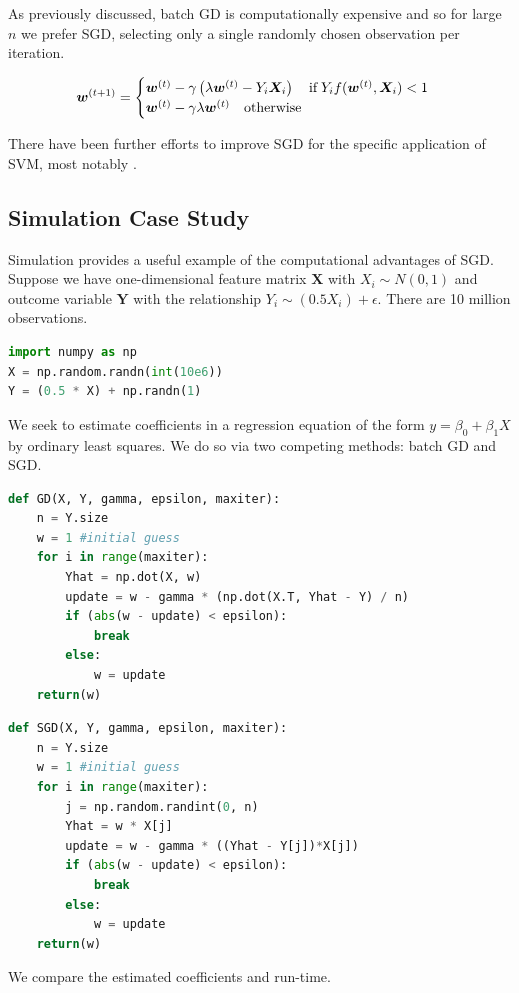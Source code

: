 \documentclass{article}
\begin{document}
As previously discussed, batch GD is computationally expensive and
so for large $n$ we prefer SGD, selecting only a single randomly chosen
observation per iteration.

\begin{equation}
	\bm{w}^{(t+1)} = 
	\begin{cases}
		\bm{w}^{(t)} - \gamma 
		\left(
			\lambda \bm{w}^{(t)} - Y_i\bm{X}_i
		\right)
		\quad \mathrm{if} \hspace{0.2em} Y_if(\bm{w}^{(t)}, \bm{X}_i) < 1 \\

		\bm{w}^{(t)} - \gamma 
		\lambda \bm{w}^{(t)} 
		\quad \textrm{otherwise} \\

	\end{cases}
\end{equation}

There have been further efforts to improve SGD for the specific application of
SVM, most notably \cite{shalev2011pegasos}.

\subsection{Simulation Case Study}

Simulation provides a useful example of the computational advantages of SGD. 
Suppose we have one-dimensional feature matrix $\bm{X}$ with $X_i \sim N(0, 1)$ 
and outcome variable $\bm{Y}$ with the
relationship $Y_i \sim (0.5 X_i) + \epsilon$. There are 10 million observations.

\begin{lstlisting}[language=Python]
import numpy as np
X = np.random.randn(int(10e6))
Y = (0.5 * X) + np.randn(1)
\end{lstlisting}

We seek to estimate coefficients in a regression equation of the form $y = \beta_0 + \beta_1 X$ by ordinary least
squares. We do so via two competing methods: batch GD and SGD.
\begin{lstlisting}[language=Python]
def GD(X, Y, gamma, epsilon, maxiter):
	n = Y.size
	w = 1 #initial guess
	for i in range(maxiter):
		Yhat = np.dot(X, w)
		update = w - gamma * (np.dot(X.T, Yhat - Y) / n)
		if (abs(w - update) < epsilon): 
			break
		else:
			w = update
	return(w)
\end{lstlisting}
\begin{lstlisting}[language=Python]
def SGD(X, Y, gamma, epsilon, maxiter):
	n = Y.size
	w = 1 #initial guess
	for i in range(maxiter):
		j = np.random.randint(0, n)
		Yhat = w * X[j]
		update = w - gamma * ((Yhat - Y[j])*X[j])
		if (abs(w - update) < epsilon):
			break
		else:
			w = update
	return(w)
\end{lstlisting}
We compare the estimated coefficients and run-time.
\end{document}
